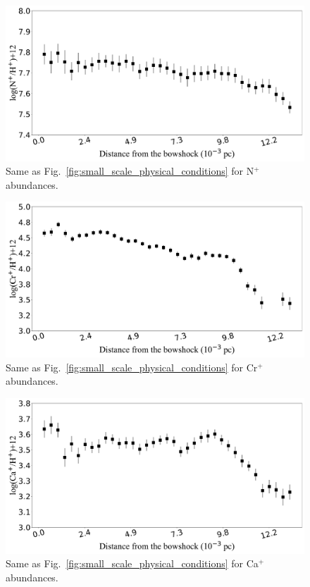 \documentclass[twocolumn]{aastex63}
\begin{document}
\begin{figure}
\centering
\includegraphics[width=\columnwidth]{N2_distribution.pdf}
\caption{Same as Fig.~\ref{fig:small_scale_physical_conditions} for N$^{+}$ abundances.}
\label{fig:N2_abundances}
\end{figure}

\begin{figure}
\centering
\includegraphics[width=\columnwidth]{Cr2_distribution.pdf}
\caption{Same as Fig.~\ref{fig:small_scale_physical_conditions} for Cr$^{+}$ abundances.}
\label{fig:Cr2_abundances}
\end{figure}

\begin{figure}
\centering
\includegraphics[width=\columnwidth]{Ca2_distribution.pdf}
\caption{Same as Fig.~\ref{fig:small_scale_physical_conditions} for Ca$^{+}$ abundances.}
\label{fig:Ca2_abundances}
\end{figure}
\end{document}
